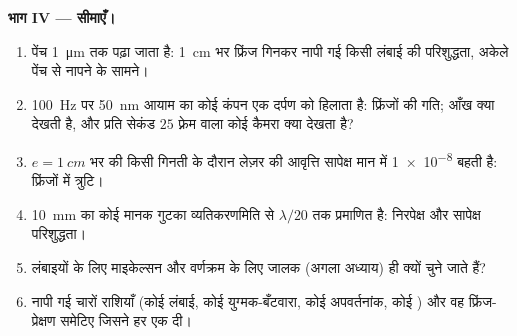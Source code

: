 \begin{problem}
\medskip
\noindent\textbf{भाग IV --- सीमाएँ।}
\begin{enumerate}[resume]
  \item पेंच \qty{1}{\micro m} तक पढ़ा जाता है: \qty{1}{cm} भर फ्रिंज गिनकर नापी गई
        किसी लंबाई की परिशुद्धता, अकेले पेंच से नापने के
        सामने।
  \item \qty{100}{Hz} पर \qty{50}{nm} आयाम का कोई कंपन एक दर्पण को हिलाता
        है: फ्रिंजों की गति; आँख क्या देखती है, और प्रति सेकंड $25$ फ़्रेम
        वाला कोई कैमरा क्या देखता है?
  \item $e = \qty{1}{cm}$ भर की किसी गिनती के दौरान लेज़र की आवृत्ति सापेक्ष मान में
        \qty{1e-8}{} बहती है: फ्रिंजों में त्रुटि।
  \item \qty{10}{mm} का कोई मानक गुटका व्यतिकरणमिति से $\lambda/20$ तक
        प्रमाणित है: निरपेक्ष और सापेक्ष परिशुद्धता।
  \item लंबाइयों के लिए माइकेल्सन और वर्णक्रम के लिए जालक (अगला अध्याय)
        ही क्यों चुने जाते हैं?
  \item नापी गई चारों राशियाँ (कोई लंबाई, कोई युग्मक-बँटवारा,
        कोई अपवर्तनांक, कोई ) और वह फ्रिंज-प्रेक्षण
        समेटिए जिसने हर एक दी।
\end{enumerate}
\end{problem}
